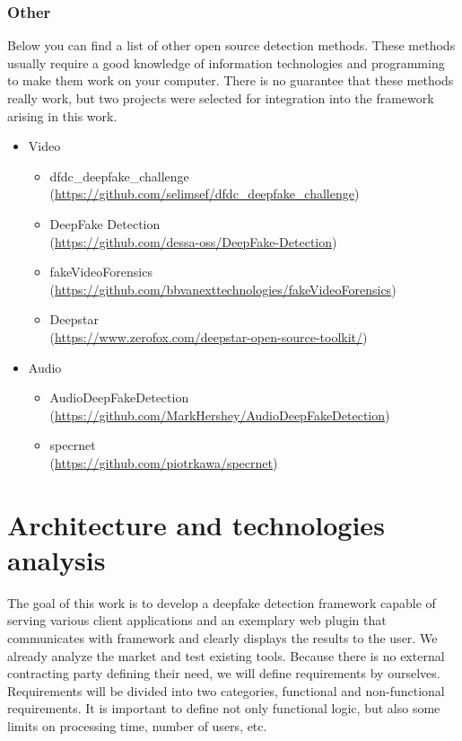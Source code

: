 \subsection{Other}

Below you can find a list of other open source detection methods. These methods usually require a good knowledge of information technologies and programming to make them work on your computer. There is no guarantee that these methods really work, but two projects were selected for integration into the framework arising in this work.

\begin{itemize}
    \item Video
    \begin{itemize}
        \item dfdc\_deepfake\_challenge \\ (\url{https://github.com/selimsef/dfdc_deepfake_challenge})
        \item DeepFake Detection \\ (\url{https://github.com/dessa-oss/DeepFake-Detection})
        \item fakeVideoForensics \\ (\url{https://github.com/bbvanexttechnologies/fakeVideoForensics})
        \item Deepstar \\ (\url{https://www.zerofox.com/deepstar-open-source-toolkit/})
    \end{itemize}
\newpage
    \item Audio
    \begin{itemize}
        \item AudioDeepFakeDetection \\ (\url{https://github.com/MarkHershey/AudioDeepFakeDetection})
        \item specrnet \\ (\url{https://github.com/piotrkawa/specrnet})
    \end{itemize}
\end{itemize}

\chapter{Architecture and technologies analysis}

The goal of this work is to develop a deepfake detection framework capable of serving various client applications and an exemplary web plugin that communicates with framework and clearly displays the results to the user. We already analyze the market and test existing tools. Because there is no external contracting party defining their need, we will define requirements by ourselves. Requirements will be divided into two categories, functional and non-functional requirements. It is important to define not only functional logic, but also some limits on processing time, number of users, etc.

